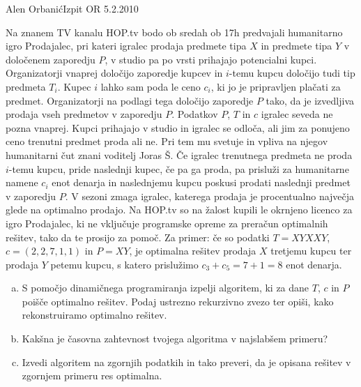 \begin{naloga}{Alen Orbanić}{Izpit OR 5.2.2010}
\begin{vprasanje}
Na znanem TV kanalu HOP.tv bodo ob sredah ob 17h
predvajali humanitarno igro Prodajalec\texttrademark,
pri kateri igralec prodaja predmete tipa $X$ in predmete tipa $Y$
v določenem zaporedju $P$,
v studio pa po vrsti prihajajo potencialni kupci.
Organizatorji vnaprej določijo zaporedje kupcev
in $i$-temu kupcu določijo tudi tip predmeta $T_i$.
Kupec $i$ lahko sam poda le ceno $c_i$,
ki jo je pripravljen plačati za predmet.
Organizatorji na podlagi tega določijo zaporedje $P$ tako,
da je izvedljiva prodaja vseh predmetov v zaporedju $P$.
Podatkov $P$, $T$ in $c$ igralec seveda ne pozna vnaprej.
Kupci prihajajo v studio in igralec se odloča,
ali jim za ponujeno ceno trenutni predmet proda ali ne.
Pri tem mu svetuje in vpliva na njegov humanitarni čut
znani voditelj Joras Š.
Če igralec trenutnega predmeta ne proda $i$-temu kupcu,
pride naslednji kupec, če pa ga proda,
pa prisluži za humanitarne namene $c_i$ enot denarja
in naslednjemu kupcu poskusi prodati naslednji predmet v zaporedju $P$.
V sezoni zmaga igralec,
katerega prodaja je procentualno največja glede na optimalno prodajo.
Na HOP.tv so na žalost kupili
le okrnjeno licenco za igro Prodajalec\texttrademark,
ki ne vključuje programske opreme za preračun optimalnih rešitev,
tako da te prosijo za pomoč.
Za primer: če so podatki $T = XYXXY$, $c = (2, 2, 7, 1, 1)$ in $P = XY$,
je optimalna rešitev prodaja $X$ tretjemu kupcu ter prodaja $Y$ petemu kupcu,
s katero prislužimo $c_3 + c_5 = 7 + 1 = 8$ enot denarja.

\begin{enumerate}[(a)]
\item S pomočjo dinamičnega programiranja izpelji algoritem,
ki za dane $T$, $c$ in $P$ poišče optimalno rešitev.
Podaj ustrezno rekurzivno zvezo ter opiši,
kako rekonstruiramo optimalno rešitev.

\item Kakšna je časovna zahtevnost tvojega algoritma v najslabšem primeru?

\item Izvedi algoritem na zgornjih podatkih in tako preveri,
da je opisana rešitev v zgornjem primeru res optimalna.
\end{enumerate}
\end{vprasanje}
\begin{odgovor}
\end{odgovor}
\end{naloga}
